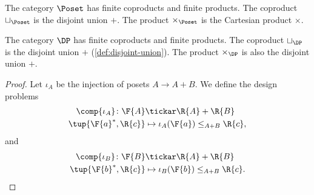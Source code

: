 \begin{example}
    The category $\Poset$ has finite coproducts and finite products.
    The coproduct $\sqcup_\Poset$ is the disjoint union $+$.
    The product $\times_\Poset$ is the Cartesian product $\times$.
\end{example}

\begin{lemma}
    The category $\DP$ has finite coproducts and finite products.
    The coproduct $\sqcup_\DP$ is the disjoint union $+$ (\cref{def:disjoint-union}).
    The product $\times_\DP$ is also the disjoint union $+$.
\end{lemma}

\begin{proof}
Let $\iota_A$ be the injection of posets $A \to A+B$. We define the design problems
\begin{equation}
    \begin{aligned}
    \comp{\iota_A} \colon \F{A} &\tickar \R{A} + \R{B}\\
    \tup{\F{a}^*,\R{c}} &\mapsto \iota_A(\F{a})\leq_{A+B}\R{c},
    \end{aligned}
\end{equation}
and 
\begin{equation}
    \begin{aligned}
    \comp{\iota_B} \colon \F{B} &\tickar \R{A} + \R{B}\\
    \tup{\F{b}^*,\R{c}} &\mapsto \iota_B(\F{b})\leq_{A+B}\R{c}.
    \end{aligned}
\end{equation}


\end{proof}
